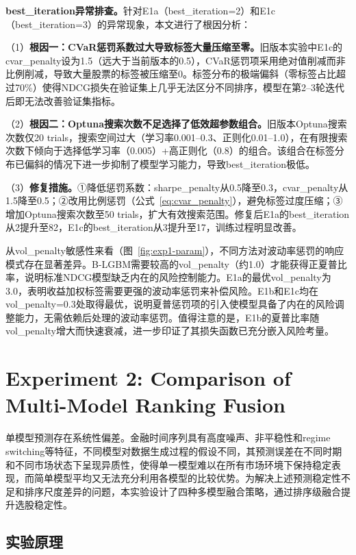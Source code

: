 \documentclass[11pt,a4paper]{ctexart}
\begin{document}
\textbf{best\_iteration异常排查。}针对E1a（best\_iteration=2）和E1c（best\_iteration=3）的异常现象，本文进行了根因分析：

（1）\textbf{根因一：CVaR惩罚系数过大导致标签大量压缩至零。}旧版本实验中E1c的cvar\_penalty设为1.5（远大于当前版本的0.5），CVaR惩罚项采用绝对值削减而非比例削减，导致大量股票的标签被压缩至0。标签分布的极端偏斜（零标签占比超过70\%）使得NDCG损失在验证集上几乎无法区分不同排序，模型在第2--3轮迭代后即无法改善验证集指标。

（2）\textbf{根因二：Optuna搜索次数不足选择了低效超参数组合。}旧版本Optuna搜索次数仅20 trials，搜索空间过大（学习率0.001--0.3、正则化0.01--1.0），在有限搜索次数下倾向于选择低学习率（0.005）+高正则化（0.8）的组合。该组合在标签分布已偏斜的情况下进一步抑制了模型学习能力，导致best\_iteration极低。

（3）\textbf{修复措施。}①降低惩罚系数：sharpe\_penalty从0.5降至0.3，cvar\_penalty从1.5降至0.5；②改用比例惩罚（公式~\ref{eq:cvar_penalty}），避免标签过度压缩；③增加Optuna搜索次数至50 trials，扩大有效搜索范围。修复后E1a的best\_iteration从2提升至82，E1c的best\_iteration从3提升至17，训练过程明显改善。

从vol\_penalty敏感性来看（图~\ref{fig:exp1-param}），不同方法对波动率惩罚的响应模式存在显著差异。B-LGBM需要较高的vol\_penalty（约1.0）才能获得正夏普比率，说明标准NDCG模型缺乏内在的风险控制能力。E1a的最优vol\_penalty为3.0，表明收益加权标签需要更强的波动率惩罚来补偿风险。E1b和E1c均在vol\_penalty=0.3处取得最优，说明夏普惩罚项的引入使模型具备了内在的风险调整能力，无需依赖后处理的波动率惩罚。值得注意的是，E1b的夏普比率随vol\_penalty增大而快速衰减，进一步印证了其损失函数已充分嵌入风险考量。



\section{Experiment 2: Comparison of Multi-Model Ranking Fusion}

单模型预测存在系统性偏差。金融时间序列具有高度噪声、非平稳性和regime switching等特征，不同模型对数据生成过程的假设不同，其预测误差在不同时期和不同市场状态下呈现异质性，使得单一模型难以在所有市场环境下保持稳定表现，而简单模型平均又无法充分利用各模型的比较优势。为解决上述预测稳定性不足和排序尺度差异的问题，本实验设计了四种多模型融合策略，通过排序级融合提升选股稳定性。

\subsection{实验原理}
\end{document}
